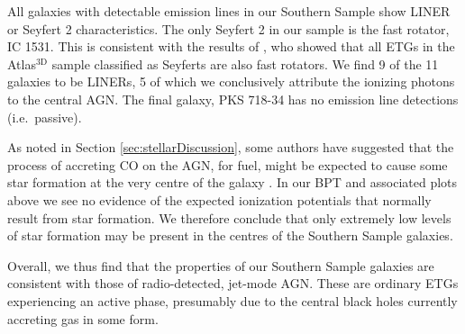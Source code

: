 	All galaxies with detectable emission lines in our Southern Sample show LINER or Seyfert 2 characteristics. The only Seyfert 2 in our sample is the fast rotator, IC 1531. This is consistent with the results of \citet{Nyland2016}, who showed that all ETGs in the Atlas$^\text{3D}$ sample classified as Seyferts are also fast rotators. We find 9 of the 11 galaxies to be LINERs, 5 of which we conclusively attribute the ionizing photons to the central AGN. The final galaxy, PKS 718-34 has no emission line detections (i.e.\ passive). 

	As noted in Section \ref{sec:stellarDiscussion}, some authors have suggested that the process of accreting CO on the AGN, for fuel, might be expected to cause some star formation at the very centre of the galaxy \citep[e.g.][]{Collin1999, Diamond-Stanic2012, LaMassa2013}. In our BPT and associated plots above we see no evidence of the expected ionization potentials that normally result from star formation. We therefore conclude that only extremely low levels of star formation may be present in the centres of the Southern Sample galaxies. 

	Overall, we thus find that the properties of our Southern Sample galaxies are consistent with those of radio-detected, jet-mode AGN. These are ordinary ETGs experiencing an active phase, presumably due to the central black holes currently accreting gas in some form. 
